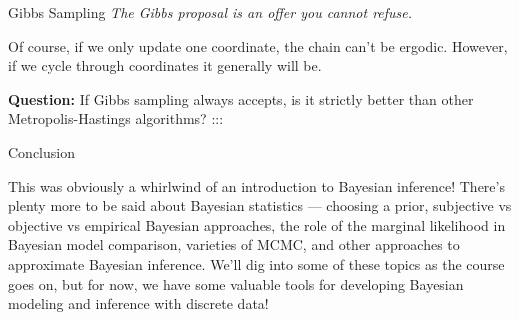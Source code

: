 \documentclass[aspectratio=169]{beamer}
\begin{document}
\begin{frame}[t,allowframebreaks]{Gibbs Sampling}
\textit{The Gibbs proposal is an offer you cannot refuse.}

Of course, if we only update one coordinate, the chain can't be ergodic.
However, if we cycle through coordinates it generally will be.

\textbf{Question:} If Gibbs sampling always accepts, is it strictly
better than other Metropolis-Hastings algorithms? :::
\end{frame}

\begin{frame}[t,allowframebreaks]{Conclusion}\label{conclusion}

This was obviously a whirlwind of an introduction to Bayesian inference!
There's plenty more to be said about Bayesian statistics --- choosing a
prior, subjective vs objective vs empirical Bayesian approaches, the
role of the marginal likelihood in Bayesian model comparison, varieties
of MCMC, and other approaches to approximate Bayesian inference. We'll
dig into some of these topics as the course goes on, but for now, we
have some valuable tools for developing Bayesian modeling and inference
with discrete data!
\end{frame}

    
    
\end{document}
